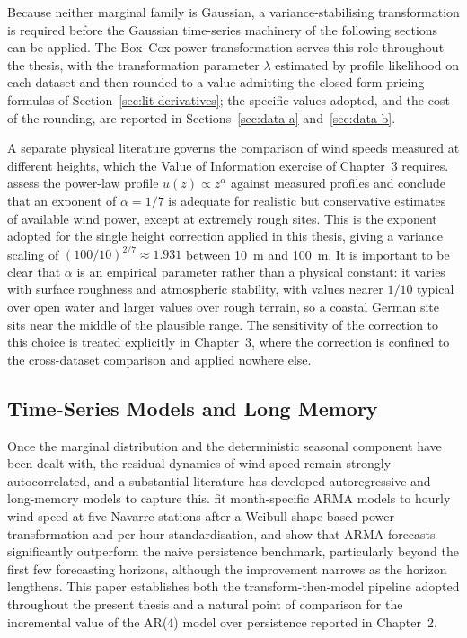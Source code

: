 ﻿\documentclass[11pt, a4paper, twoside]{article}
\begin{document}
Because neither marginal family is Gaussian, a variance-stabilising transformation is required before the Gaussian time-series machinery of the following sections can be applied. The Box--Cox power transformation serves this role throughout the thesis, with the transformation parameter $\lambda$ estimated by profile likelihood on each dataset and then rounded to a value admitting the closed-form pricing formulas of Section~\ref{sec:lit-derivatives}; the specific values adopted, and the cost of the rounding, are reported in Sections~\ref{sec:data-a} and~\ref{sec:data-b}.

A separate physical literature governs the comparison of wind speeds measured at different heights, which the Value of Information exercise of Chapter~3 requires. \citet{PetersonHennessey1978} assess the power-law profile $u(z) \propto z^{\alpha}$ against measured profiles and conclude that an exponent of $\alpha = 1/7$ is adequate for realistic but conservative estimates of available wind power, except at extremely rough sites. This is the exponent adopted for the single height correction applied in this thesis, giving a variance scaling of $(100/10)^{2/7} \approx 1.931$ between 10~m and 100~m. It is important to be clear that $\alpha$ is an empirical parameter rather than a physical constant: it varies with surface roughness and atmospheric stability, with values nearer $1/10$ typical over open water and larger values over rough terrain, so a coastal German site sits near the middle of the plausible range. The sensitivity of the correction to this choice is treated explicitly in Chapter~3, where the correction is confined to the cross-dataset comparison and applied nowhere else.

\subsection{Time-Series Models and Long Memory}
\label{sec:lit-timeseries}

Once the marginal distribution and the deterministic seasonal component have been dealt with, the residual dynamics of wind speed remain strongly autocorrelated, and a substantial literature has developed autoregressive and long-memory models to capture this. \citet{Torres2005} fit month-specific ARMA models to hourly wind speed at five Navarre stations after a Weibull-shape-based power transformation and per-hour standardisation, and show that ARMA forecasts significantly outperform the naive persistence benchmark, particularly beyond the first few forecasting horizons, although the improvement narrows as the horizon lengthens. This paper establishes both the transform-then-model pipeline adopted throughout the present thesis and a natural point of comparison for the incremental value of the AR(4) model over persistence reported in Chapter~2.
\end{document}
